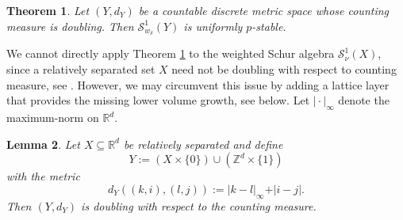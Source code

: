 \documentclass{amsart}
\newtheorem{theorem}{Theorem}
\newtheorem{lem.}[theorem]{Lemma}
\begin{document}
\begin{theorem}\label{prop:tessera-p-stability}\cite{TESSERA20102793}
Let $(Y,d_Y)$ be a countable discrete metric space whose counting measure is doubling. Then $\mathcal{S}^1_{w_\delta}(Y)$ is uniformly $p$-stable.
\end{theorem}

We cannot directly apply Theorem \ref{prop:tessera-p-stability} to the weighted Schur algebra $\mathcal{S}^1_{\nu}(X)$, since a relatively separated set $X$ need not be doubling with respect to counting measure, see \cite[Remark~2.3]{Sun2008FramesIS}. However, we may circumvent this issue by adding a lattice layer that provides the missing lower volume growth, see below. Let $\vert \cdot \vert_\infty$ denote the maximum-norm on $\mathbb{R}^d$.

\begin{lem.}
\label{lem:doubling-extension}
Let \(X\subseteq\mathbb R^d\) be relatively separated and define
$$Y:= (X\times\{0\})\cup(\mathbb Z^d\times\{1\})$$
with the metric 
$$d_Y((k,i),(l,j)) :=\vert k-l\vert_\infty + \vert i-j \vert.$$
Then $(Y,d_Y)$ is doubling with respect to the counting measure.
\end{lem.}
\end{document}
